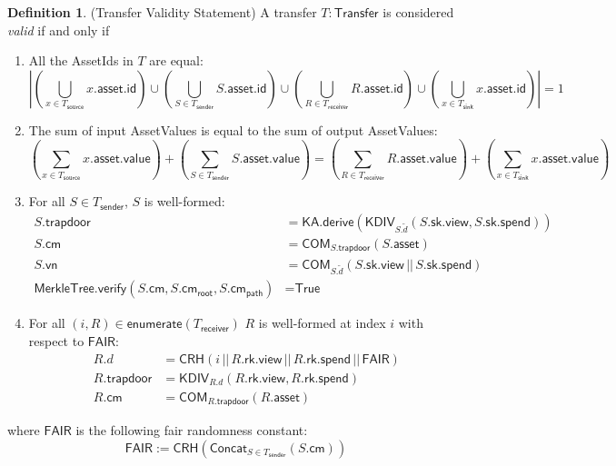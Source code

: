 \documentclass[a4paper]{article}
\theoremstyle{definition}
\newtheorem{definition}{Definition}[subsection]
\renewcommand{\abs}[1]{\left|#1\right|}
\newcommand{\AssetId}{{\textsf{AssetId}}}
\newcommand{\AssetValue}{{\textsf{AssetValue}}}
\newcommand{\COM}{{\textsf{COM}}}
\newcommand{\CRH}{{\textsf{CRH}}}
\newcommand{\Concat}{{\textsf{Concat}}}
\newcommand{\Enumerate}{{\textsf{enumerate}}}
\newcommand{\FAIR}{{\textsf{FAIR}}}
\newcommand{\ID}{{\textsf{id}}}
\newcommand{\KA}{{\textsf{KA}}}
\newcommand{\KDIV}{{\textsf{KDIV}}}
\newcommand{\MerkleTree}{{\textsf{MerkleTree}}}
\newcommand{\PATH}{{\textsf{path}}}
\newcommand{\ROOT}{{\textsf{root}}}
\newcommand{\Statement}{{\textsf{Statement}}}
\newcommand{\Transfer}{{\textsf{Transfer}}}
\newcommand{\True}{{\textsf{True}}}
\newcommand{\VALUE}{{\textsf{value}}}
\newcommand{\asset}{{\textsf{asset}}}
\newcommand{\cm}{{\textsf{cm}}}
\newcommand{\derive}{{\textsf{derive}}}
\newcommand{\receiver}{{\textsf{receiver}}}
\newcommand{\rk}{{\textsf{rk}}}
\newcommand{\sender}{{\textsf{sender}}}
\newcommand{\sink}{{\textsf{sink}}}
\newcommand{\sk}{{\textsf{sk}}}
\newcommand{\source}{{\textsf{source}}}
\newcommand{\spend}{{\textsf{spend}}}
\newcommand{\trapdoor}{{\textsf{trapdoor}}}
\newcommand{\verify}{{\textsf{verify}}}
\newcommand{\view}{{\textsf{view}}}
\newcommand{\vn}{{\textsf{vn}}}
\begin{document}
\begin{definition}(\Transfer{} Validity \Statement{}) A transfer $T : \Transfer$ is considered \emph{valid} if and only if
    \begin{enumerate}
        \item All the \AssetId{s} in $T$ are equal:
            \[
                \abs{
                    \left(\bigcup_{x \in T_\source} x.\asset.\ID \right)
                    \cup
                    \left(\bigcup_{S \in T_\sender} S.\asset.\ID \right)
                    \cup
                    \left(\bigcup_{R \in T_\receiver} R.\asset.\ID \right)
                    \cup
                    \left(\bigcup_{x \in T_\sink} x.\asset.\ID \right)
                } = 1
            \]
        \item The sum of input \AssetValue{s} is equal to the sum of output \AssetValue{s}:
            \[
                \left(\sum_{x \in T_\source} x.\asset.\VALUE\right)
                +
                \left(\sum_{S \in T_\sender} S.\asset.\VALUE\right)
                =
                \left(\sum_{R \in T_\receiver} R.\asset.\VALUE\right)
                +
                \left(\sum_{x \in T_\sink} x.\asset.\VALUE\right)
            \]
        \item For all $S \in T_\sender$, $S$ is well-formed:
            \begin{align*}
                S.\trapdoor                                          &= \KA.\derive(\KDIV_{S.\tilde{d}}(S.\sk.\view, S.\sk.\spend)) \\
                S.\cm                                                &= \COM_{S.\trapdoor}(S.\asset) \\
                S.\vn                                                &= \COM_{S.\tilde{d}}(S.\sk.\view \,||\, S.\sk.\spend) \\
                \MerkleTree.\verify(S.\cm, S.\cm_\ROOT, S.\cm_\PATH) &= \True
            \end{align*}
        \item For all $(i, R) \in \Enumerate(T_\receiver)$ $R$ is well-formed at index $i$ with respect to $\FAIR$:
            \begin{align*}
                R.d         &= \CRH(i \,||\, R.\rk.\view \,||\, R.\rk.\spend \,||\, \FAIR) \\
                R.\trapdoor &= \KDIV_{R.d}(R.\rk.\view, R.\rk.\spend) \\
                R.\cm       &= \COM_{R.\trapdoor}(R.\asset)
            \end{align*}
    \end{enumerate}
    where $\FAIR$ is the following fair randomness constant:
    \[\FAIR := \CRH(\Concat_{S \in T_\sender}(S.\cm))\]
\end{definition}
\end{document}
